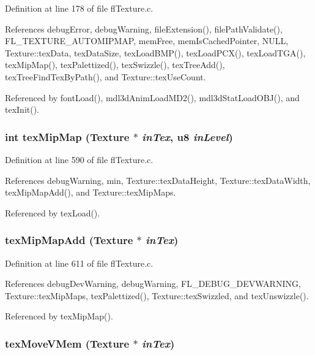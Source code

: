 Definition at line 178 of file fl\-Texture.c.

References debug\-Error, debug\-Warning, file\-Extension(), file\-Path\-Validate(), FL\_\-TEXTURE\_\-AUTOMIPMAP, mem\-Free, mem\-Is\-Cached\-Pointer, NULL, Texture::tex\-Data, tex\-Data\-Size, tex\-Load\-BMP(), tex\-Load\-PCX(), tex\-Load\-TGA(), tex\-Mip\-Map(), tex\-Palettized(), tex\-Swizzle(), tex\-Tree\-Add(), tex\-Tree\-Find\-Tex\-By\-Path(), and Texture::tex\-Use\-Count.

Referenced by font\-Load(), mdl3d\-Anim\-Load\-MD2(), mdl3d\-Stat\-Load\-OBJ(), and tex\-Init().
\subsubsection{\setlength{\rightskip}{0pt plus 5cm}int tex\-Mip\-Map ({\bf Texture} $\ast$ {\em in\-Tex}, u8 {\em in\-Level})}\label{flTexture_8h_ccd044292ceedac29759d5f3fb600e52}




Definition at line 590 of file fl\-Texture.c.

References debug\-Warning, min, Texture::tex\-Data\-Height, Texture::tex\-Data\-Width, tex\-Mip\-Map\-Add(), and Texture::tex\-Mip\-Maps.

Referenced by tex\-Load().
\subsubsection{ tex\-Mip\-Map\-Add ({\bf Texture} $\ast$ {\em in\-Tex})}\label{flTexture_8h_ef3fcbb2958ad0f0f4ece629b81b82e7}




Definition at line 611 of file fl\-Texture.c.

References debug\-Dev\-Warning, debug\-Warning, FL\_\-DEBUG\_\-DEVWARNING, Texture::tex\-Mip\-Maps, tex\-Palettized(), Texture::tex\-Swizzled, and tex\-Unswizzle().

Referenced by tex\-Mip\-Map().
\subsubsection{ tex\-Move\-VMem ({\bf Texture} $\ast$ {\em in\-Tex})}\label{flTexture_8h_2ef41233c1e08b86325c0453443cd6dd}




